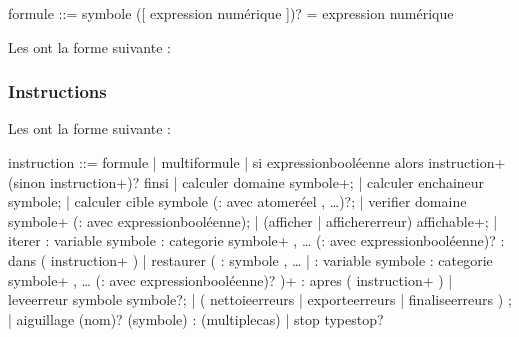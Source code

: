 \documentclass[letterpaper,10pt,french]{sphinxmanual}
\begin{document}
\begin{sphinxVerbatim}[commandchars=\\\{\}]
\PYGZlt{}formule\PYGZgt{} ::=
    \PYGZlt{}symbole\PYGZgt{} ([ \PYGZlt{}expression numérique\PYGZgt{} ])? = \PYGZlt{}expression numérique\PYGZgt{}
\end{sphinxVerbatim}

\sphinxAtStartPar
Les  ont la forme suivante :

\begin{sphinxVerbatim}[commandchars=\\\{\}]
     
\end{sphinxVerbatim}


\subsubsection{Instructions}
\label{\detokenize{syntax:instructions}}
\sphinxAtStartPar
Les  ont la forme suivante :

\begin{sphinxVerbatim}[commandchars=\\\{\}]
\PYGZlt{}instruction\PYGZgt{} ::=
  \PYGZlt{}formule\PYGZgt{}
  | \PYGZlt{}multi\PYGZhy{}formule\PYGZgt{} 
  | si \PYGZlt{}expression\PYGZti{}booléenne\PYGZgt{}
    alors \PYGZlt{}instruction\PYGZgt{}+
    (sinon \PYGZlt{}instruction\PYGZgt{}+)?
    finsi 
  | calculer domaine \PYGZlt{}symbole\PYGZgt{}+;
  | calculer enchaineur \PYGZlt{}symbole\PYGZgt{};
  | calculer cible \PYGZlt{}symbole\PYGZgt{}
    (: avec \PYGZlt{}atome\PYGZti{}réel\PYGZgt{} , …)?;
  | verifier domaine \PYGZlt{}symbole\PYGZgt{}+
    (: avec \PYGZlt{}expression\PYGZti{}booléenne\PYGZgt{});
  | (afficher | afficher\PYGZus{}\PYGZus{}erreur) \PYGZlt{}affichable\PYGZgt{}+;
  | iterer 
    : variable \PYGZlt{}symbole\PYGZgt{}
    : categorie \PYGZlt{}symbole\PYGZgt{}+ , …
    (: avec \PYGZlt{}expression\PYGZti{}booléenne\PYGZgt{})? 
    : dans ( \PYGZlt{}instruction\PYGZgt{}+ ) 
  | restaurer 
    ( 
    : \PYGZlt{}symbole\PYGZgt{} , … 
     | : variable \PYGZlt{}symbole\PYGZgt{} : categorie \PYGZlt{}symbole\PYGZgt{}+ , … 
       (: avec \PYGZlt{}expression\PYGZti{}booléenne\PYGZgt{})? 
    )+ 
    : apres ( \PYGZlt{}instruction\PYGZgt{}+ ) 
  | leve\PYGZus{}\PYGZus{}erreur \PYGZlt{}symbole\PYGZgt{} \PYGZlt{}symbole\PYGZgt{}?;
  | (
      nettoie\PYGZus{}\PYGZus{}erreurs
      | exporte\PYGZus{}\PYGZus{}erreurs
      | finalise\PYGZus{}\PYGZus{}erreurs
    ) ;
  | aiguillage (nom)? (\PYGZlt{}symbole\PYGZgt{}) : (\PYGZlt{}multiple\PYGZus{}cas\PYGZgt{})
  | stop \PYGZlt{}type\PYGZus{}stop\PYGZgt{}?
\end{sphinxVerbatim}
\end{document}
